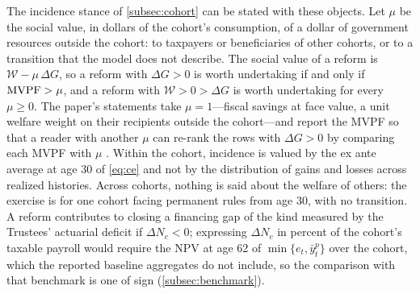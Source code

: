 The incidence stance of \autoref{subsec:cohort} can be stated with these objects. Let $\mu$ be the social value, in dollars of the cohort's consumption, of a dollar of government resources outside the cohort: to taxpayers or beneficiaries of other cohorts, or to a transition that the model does not describe. The social value of a reform is $\mathcal{W}-\mu\,\Delta G$, so a reform with $\Delta G>0$ is worth undertaking if and only if $\operatorname{MVPF}>\mu$, and a reform with $\mathcal{W}>0>\Delta G$ is worth undertaking for every $\mu\ge0$. The paper's statements take $\mu=1$---fiscal savings at face value, a unit welfare weight on their recipients outside the cohort---and report the MVPF so that a reader with another $\mu$ can re-rank the rows with $\Delta G>0$ by comparing each MVPF with $\mu$ \citep{hendren2020unified}. Within the cohort, incidence is valued by the ex ante average at age 30 of \eqref{eq:ce} and not by the distribution of gains and losses across realized histories. Across cohorts, nothing is said about the welfare of others: the exercise is for one cohort facing permanent rules from age 30, with no transition. A reform contributes to closing a financing gap of the kind measured by the Trustees' actuarial deficit if $\Delta N_c<0$; expressing $\Delta N_c$ in percent of the cohort's taxable payroll would require the NPV at age 62 of $\min\{e_t,\bar y^{p}_t\}$ over the cohort, which the reported baseline aggregates do not include, so the comparison with that benchmark is one of sign (\autoref{subsec:benchmark}).
